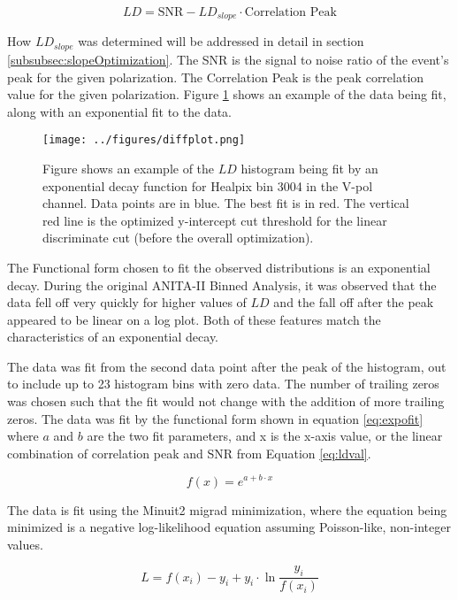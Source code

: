 \begin{equation} \label{eq:ldval}
LD =  \textrm{SNR} - LD_{slope} \cdot \textrm{Correlation Peak} 
\end{equation}

How $LD_{slope}$ was determined will be addressed in detail in section \ref{subsubsec:slopeOptimization}.  The SNR is the signal to noise ratio of the event's peak for the given polarization.  The Correlation Peak is the peak correlation value for the given polarization.  Figure \ref{fig:diffplot} shows an example of the data being fit, along with an exponential fit to the data.

\begin{figure}[h]
\centering
\texttt{[image: ../figures/diffplot.png]}
\caption[Exponential Fit Example]{Figure shows an example of the $LD$ histogram being fit by an exponential decay function for Healpix bin 3004 in the V-pol channel.  Data points are in blue.  The best fit is in red.  The vertical red line is the optimized y-intercept cut threshold for the linear discriminate cut (before the overall optimization).}
\label{fig:diffplot}
\end{figure}

The Functional form chosen to fit the observed distributions is an exponential decay.  During the original ANITA-II Binned Analysis, it was observed that the data fell off very quickly for higher values of $LD$ and the fall off after the peak appeared to be linear on a log plot.  Both of these features match the characteristics of an exponential decay.  

The data was fit from the second data point after the peak of the histogram, out to include up to 23 histogram bins with zero data.  The number of trailing zeros was chosen such that the fit would not change with the addition of more trailing zeros.  The data was fit by the functional form shown in equation \ref{eq:expofit} where $a$ and $b$ are the two fit parameters, and x is the x-axis value, or the linear combination of correlation peak and SNR from Equation \ref{eq:ldval}.

\begin{equation} \label{eq:expofit}
f(x) = e^{a+b \cdot x}
\end{equation}

 The data is fit using the Minuit2 migrad minimization, where the equation being minimized is a negative log-likelihood equation assuming Poisson-like, non-integer values.  

\begin{equation} \label{eq:fitLikelihood}
L = f(x_i) - y_i + y_i \cdot \ln{\frac{y_i}{f(x_i)}}
\end{equation}

